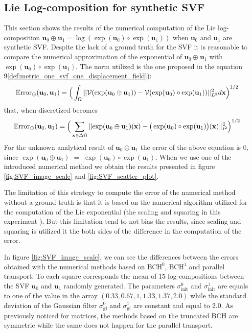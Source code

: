 \subsection{Lie Log-composition for synthetic SVF}
This section shows the results of the numerical computation of the Lie log-composition $\mathbf{u}_0\oplus\mathbf{u}_1 = \log(\exp(\mathbf{u}_0)\circ \exp(\mathbf{u}_1))$ when $\mathbf{u}_0$ and $\mathbf{u}_1$ are synthetic SVF. Despite the lack of a ground truth for the SVF it is reasonable to compare the numerical approximation of the exponential of $\mathbf{u}_0\oplus\mathbf{u}_1$ with $\exp(\mathbf{u}_0)\circ \exp(\mathbf{u}_1)$. The norm utilized is the one proposed in the equation 9\ref{def:metric_one_svf_one_displacement_field}):
\begin{align}
\text{Error}_{\oplus}(\mathbf{u}_0, \mathbf{u}_1)
= 
\Big(\int_{\Omega} \vert\lvert \mathcal{V}(\exp(\mathbf{u}_0\oplus\mathbf{u}_1)) - \mathcal{V}(\exp(\mathbf{u}_0)\circ \exp(\mathbf{u}_1)) \rvert\vert_{L^2}^{2} d\mathbf{x} \Big)^{1/2}
\end{align} 
that, when discretized becomes
\begin{align}\label{eq:error_svf_sythetic_data}
\text{Error}_{\oplus}(\mathbf{u}_0, \mathbf{u}_1) 
= 
\Big( \sum_{\mathbf{x} \in \Delta\Omega} 
\vert\lvert \exp(\mathbf{u}_0\oplus\mathbf{u}_1)(\mathbf{x}) 
	-
\big(\exp(\mathbf{u}_0)\circ \exp(\mathbf{u}_1)\big)(\mathbf{x}) 
	   \rvert\vert_{l^2}^{2}  \Big)^{1/2}
\end{align} 
For the unknown analytical result of $\mathbf{u}_0\oplus\mathbf{u}_1$ the error of the above equation is $0$, since $\exp(\mathbf{u}_0\oplus\mathbf{u}_1)$ $=$
$\exp(\mathbf{u}_0)\circ \exp(\mathbf{u}_1)$. When we use one of the introduced numerical method we obtain the results presented in figure \ref{fig:SVF_image_scale} and \ref{fig:SVF_scatter_plot}. 

The limitation of this strategy to compute the error of the numerical method without a ground truth is that it is based on the numerical algorithm utilized for the computation of the Lie exponential (the scaling and squaring in this experiment \cite{arsigny2006log}). But this limitation tend to not bias the results, since scaling and squaring is utilized it the both sides of the difference in the computation of the error.

In figure \ref{fig:SVF_image_scale}, we can see the differences between the errors obtained with the numerical methods based on $\text{BCH}^0$, $\text{BCH}^1$ and parallel transport. To each square corresponds the mean of $15$ log-compositions between the SVF $\mathbf{u}_0$ and $\mathbf{u}_1$ randomly generated. The parameters $\sigma_{\text{init}}^{0}$ and $\sigma_{\text{init}}^{1}$ are equals to one of the value in the array $(0.33, 0.67, 1, 1.33, 1.37, 2.0)$ while the standard deviation of the Gaussian filter $\sigma_{\text{gf}}^{0}$ and $\sigma_{\text{gf}}^{1}$ are constant and equal to $2.0$. As previously noticed for matrices, the methods based on the truncated  BCH are symmetric while the same does not happen for the parallel transport. 


